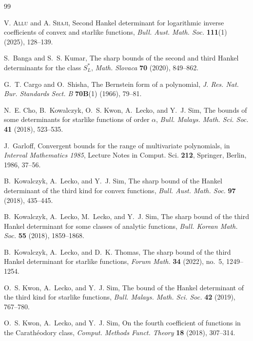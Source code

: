 \documentclass[a4paper,12pt,reqno]{amsart}
\numberwithin{equation}{section}
\begin{document}
\begin{thebibliography}{99}
	
	
	\textsc{V. Allu} and \textsc{A. Shaji},
	Second Hankel determinant for logarithmic inverse coefficients of convex and starlike functions,
	\textit{Bull. Aust. Math. Soc.} \textbf{111}(1) (2025), 128--139.
	
	S.~Banga and S.~S. Kumar,
	The sharp bounds of the second and third Hankel determinants for the class $S_L^{*}$,
	\emph{Math. Slovaca} \textbf{70} (2020), 849--862.
	
	G.~T. Cargo and O.~Shisha,
	The Bernstein form of a polynomial,
	\emph{J. Res. Nat. Bur. Standards Sect. B} \textbf{70B}(1) (1966), 79--81.
	
	N.~E. Cho, B.~Kowalczyk, O.~S. Kwon, A.~Lecko, and Y.~J. Sim,
	The bounds of some determinants for starlike functions of order $\alpha$,
	\emph{Bull. Malays. Math. Sci. Soc.} \textbf{41} (2018), 523--535.
	
	J.~Garloff,
	Convergent bounds for the range of multivariate polynomials,
	in \emph{Interval Mathematics 1985},
	Lecture Notes in Comput. Sci. \textbf{212}, Springer, Berlin, 1986, 37--56.
	
	B.~Kowalczyk, A.~Lecko, and Y.~J. Sim,
	The sharp bound of the Hankel determinant of the third kind for convex functions,
	\emph{Bull. Aust. Math. Soc.} \textbf{97} (2018), 435--445.
	
	B.~Kowalczyk, A.~Lecko, M.~Lecko, and Y.~J. Sim,
	The sharp bound of the third Hankel determinant for some classes of analytic functions,
	\emph{Bull. Korean Math. Soc.} \textbf{55} (2018), 1859--1868.
	
	B.~Kowalczyk, A.~Lecko, and D.~K. Thomas,
	The sharp bound of the third Hankel determinant for starlike functions,
	\emph{Forum Math.} \textbf{34} (2022), no.~5, 1249--1254.
	
	O.~S. Kwon, A.~Lecko, and Y.~J. Sim,
	The bound of the Hankel determinant of the third kind for starlike functions,
	\emph{Bull. Malays. Math. Sci. Soc.} \textbf{42} (2019), 767--780.
	
	O.~S. Kwon, A.~Lecko, and Y.~J. Sim,
	On the fourth coefficient of functions in the Carath\'eodory class,
	\emph{Comput. Methods Funct. Theory} \textbf{18} (2018), 307--314.
	

\end{thebibliography}
\end{document}
